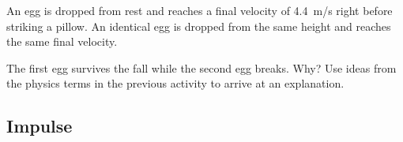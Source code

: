\documentclass[]{exam}
\begin{document}
\begin{questions}
\question
An egg is dropped from rest and reaches a final velocity of \SI{4.4}{m/s} right before striking a pillow. An identical egg is dropped from the same height and reaches the same final velocity. 

\begin{center}
\hspace{2cm}
\end{center}

The first egg survives the fall while the second egg breaks. Why? Use ideas from the physics terms in the previous activity to arrive at an explanation.
\end{questions}

\clearpage

\subsection*{Impulse}
\end{document}
